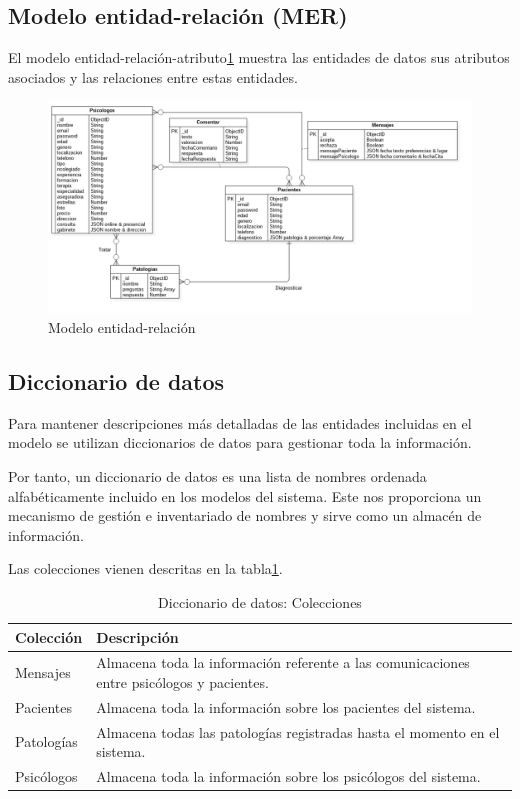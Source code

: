 \subsection{Modelo entidad-relación (MER)}
El modelo entidad-relación-atributo\ref{fig:mod_datos_mer} muestra las entidades de datos sus atributos asociados y las relaciones entre estas entidades. 


\begin{figure}[htbp] 
    \centering
    \includegraphics[width=1\textwidth]{figuras/bbdd_mod_MER.png}
    \caption{Modelo entidad-relación}
    \label{fig:mod_datos_mer}
\end{figure}

\subsection{Diccionario de datos}
Para mantener descripciones más detalladas de las entidades incluidas en el modelo se utilizan diccionarios de datos para gestionar toda la información.


Por tanto, un diccionario de datos es una lista de nombres ordenada alfabéticamente incluido en los modelos del sistema. Este nos proporciona un mecanismo de gestión e inventariado de nombres y sirve como un almacén de información.


Las colecciones vienen descritas en la tabla\ref{fig:dic_datos_colecciones}.

\begin{table}[htpb]
\centering
\begin{tabularx}{\textwidth}{|l|X|}
\hline
\rowcolor[gray]{0.9}\textbf{Colección}  & \textbf{Descripción}                                                                               \\ \hline
Mensajes   & Almacena toda la información referente a las comunicaciones entre psicólogos y pacientes. \\ \hline
Pacientes  & Almacena toda la información sobre los pacientes del sistema.                             \\ \hline
Patologías & Almacena todas las patologías registradas hasta el momento en el sistema.                 \\ \hline
Psicólogos & Almacena toda la información sobre los psicólogos del sistema.                            \\ \hline
\end{tabularx}
\caption{Diccionario de datos: Colecciones}
\label{fig:dic_datos_colecciones}
\end{table}

